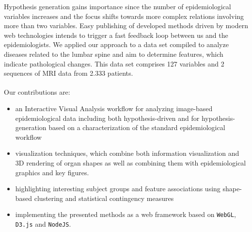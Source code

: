 \documentclass[journal]{style/vgtc} 			          %
\begin{document}
%
Hypothesis generation gains importance since the number of epidemiological variables increases and the focus shifts towards more complex relations involving more than two variables.
%
Easy publishing of developed methods driven by modern web technologies intends to trigger a fast feedback loop between us and the epidemiologists.
We applied our approach to a data set compiled to analyze diseases related to the lumbar spine and aim to determine features, which indicate pathological changes.
%
This data set comprises 127 variables and 2 sequences of MRI data from 2.333 patients.
\\\\
Our contributions are:
\begin{itemize}
	\item an Interactive Visual Analysis workflow for analyzing image-based epidemiological data including both hypothesis-driven and for hypothesis-generation based on a characterization of the standard epidemiological workflow
	\item visualization techniques, which combine both information visualization and 3D rendering of organ shapes as well as combining them with epidemiological graphics and key figures.
	\item highlighting interesting subject groups and feature associations using shape-based clustering and statistical contingency measures
	\item implementing the presented methods as a web framework based on \texttt{WebGL}, \texttt{D3.js} and \texttt{NodeJS}.
\end{itemize}
\end{document}
